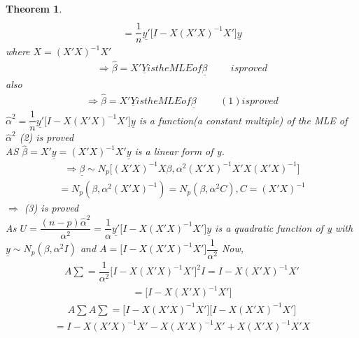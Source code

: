 \documentclass[12pt]{article}
\newtheorem{theorem}{\bf{Theorem}}[section]
\numberwithin{equation}{section}
\begin{document}
\begin{theorem}
\begin{eqnarray*}
\end{eqnarray*}
\begin{eqnarray*}
= \dfrac{1}{n}\underline{y'} \big[I-X(X'X)^{-1}X'\big]\underline{y}
\end{eqnarray*}
where $X = (X'X)^{-1}X'$
\begin{eqnarray*}
\Longrightarrow \hat{\beta} = X'\underline{Y} is the MLE of \underline{\beta} \hspace{1cm}is proved
\end{eqnarray*}
also
\begin{eqnarray*}
\Longrightarrow \hat{\beta} = X'\underline{Y} is the MLE of \underline{\beta} \hspace{1cm}(1) is proved
\end{eqnarray*}
$\hat{\alpha}^{2}= \dfrac{1}{n}\underline{y'} \big[I-X(X'X)^{-1}X'\big]\underline{y} $
is a function(a constant multiple) of the MLE of
$\hat{\alpha}^{2}$ (2) is proved\\
AS $\hat{\beta} = X'\underline{y} = (X'X)^{-1}X'\underline{y}$ is a linear form of y.
\begin{eqnarray*}
\Longrightarrow \underline{\beta} \sim N_{p}\big[(X'X)^{-1}X\beta, \alpha^{2}(X'X)^{-1}X'X(X'X)^{-1}\big]
\end{eqnarray*}
\begin{eqnarray*}
= N_{p}(\beta, \alpha^{2}(X'X)^{-1}) = N_{p}(\beta, \alpha^{2}C), C = (X'X)^{-1}
\end{eqnarray*}
$\Longrightarrow$ (3) is proved\\
As $U = \dfrac{(n-p)\hat{\alpha}^{2}}{\alpha^{2}} = \dfrac{1}{\alpha}\underline{y'}\big[I-X(X'X)^{-1}X'\big]\underline{y}$ is a quadratic function of \underline{y} with \\$\underline{y} \sim N_{p}(\beta, \alpha^{2}I)$ and $A = \big[I - X(X'X)^{-1}X'\big]\dfrac{1}{\alpha^{2}}$
Now,
\begin{eqnarray*}
A\sum = \dfrac{1}{\alpha^{2}}\big[I-X(X'X)^{-1}X'\big]^{2}I = I - X(X'X)^{-1}X'
\end{eqnarray*}
\begin{eqnarray*}
 = \big[I-X(X'X)^{-1}X'\big]
\end{eqnarray*}
\begin{eqnarray*}
A\sum A\sum  = \big[I-X(X'X)^{-1}X'\big]\big[I-X(X'X)^{-1}X'\big]
\end{eqnarray*}
\begin{eqnarray*}
= I-X(X'X)^{-1}X'-X(X'X)^{-1}X' + X(X'X)^{-1}X'X
\end{eqnarray*}
\end{theorem}
\end{document}
